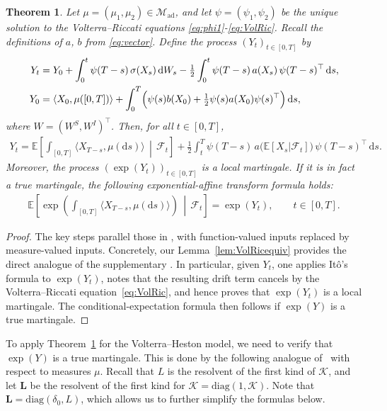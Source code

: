\documentclass[10pt,a4paper,reqno]{amsart}
\theoremstyle{plain}
\newtheorem{theorem}{Theorem}[section]
\theoremstyle{definition}
\theoremstyle{remark}
\theoremstyle{example}
\begin{document}
\begin{theorem}\label{thm:expafftransf}
   Let $\mu = (\mu_1, \mu_2) \in\mathcal{M}_{\mathrm{ad}}$, and let $\psi = (\psi_1, \psi_2)$ be the unique solution to the Volterra--Riccati equations \eqref{eq:phi1}-\eqref{eq:VolRic}. Recall the definitions of $a$, $b$ from \eqref{eq:vector}. Define the process $(Y_t)_{t\in[0,T]}$ by
\begin{align*}
    Y_t &= Y_0 + \int_0^t \psi(T-s)\,\sigma(X_s)\,\mathrm{d}W_s 
            - \tfrac{1}{2}\int_0^t \psi(T-s)\,a(X_s)\,\psi(T-s)^\top \,\mathrm{d}s, \\
    Y_0 &= \langle X_0, \mu([0,T]) \rangle + \int_0^T \Bigl(\psi(s)b(X_0) 
              + \tfrac{1}{2}\psi(s)a(X_0)\psi(s)^\top\Bigr)\,\mathrm{d}s,
\end{align*}
where $W = (W^S,W^I)^\top$. Then, for all $t \in [0,T]$,
\begin{align}\label{eq:Y}
    Y_t = \mathbb{E}\left[ \int_{[0,T]} \langle X_{T-s}, \mu(\mathrm{d}s) \rangle\,\middle|\,\mathcal{F}_t\right] 
          + \tfrac{1}{2}\int_t^T 
              \psi(T-s)\,a\bigl(\mathbb{E}[X_s|\mathcal{F}_t]\bigr)\,
              \psi(T-s)^\top \,\mathrm{d}s.
\end{align}
Moreover, the process $(\exp(Y_t))_{t\in[0,T]}$ is a local martingale. If it is in fact a true martingale, the following exponential-affine transform formula holds:
\begin{align*}
    \mathbb{E}\left[\exp \left( \int_{[0,T]} \langle X_{T-s}, \mu(\mathrm{d}s) \rangle \right)\,\middle|\,\mathcal{F}_t\right] = \exp(Y_t), \qquad t\in[0,T].
\end{align*}
\end{theorem}
\begin{proof}
    The key steps parallel those in \cite[Thm. 4.3]{abi2019affine}, with function-valued inputs replaced by measure-valued inputs. Concretely, our Lemma~\ref{lem:VolRicequiv} provides the direct analogue of the supplementary \cite[Lem. 4.4]{abi2019affine}. In particular, given $Y_t$, one applies It\^{o}'s formula to $\exp(Y_t)$, notes that the resulting drift term cancels by the Volterra--Riccati equation~\eqref{eq:VolRic}, and hence proves that $\exp(Y_t)$ is a local martingale. The conditional-expectation formula then follows if $\exp(Y)$ is a true martingale.
\end{proof}

To apply Theorem~\ref{thm:expafftransf} for the Volterra--Heston model, we need to verify that $\exp(Y)$ is a true martingale. This is done by the following analogue of~\cite[Thm.~4.5(ii)]{abi2019affine} with respect to measures $\mu$. Recall that $L$ is the resolvent of the first kind of $\mathcal{K}$, and let $\bm{L}$ be the resolvent of the first kind for $\bm{\mathcal{K}}=\mathrm{diag}(1, \mathcal{K})$. Note that $\bm{L} = \mathrm{diag}(\delta_0, L)$, which allows us to further simplify the formulas below.
\end{document}
